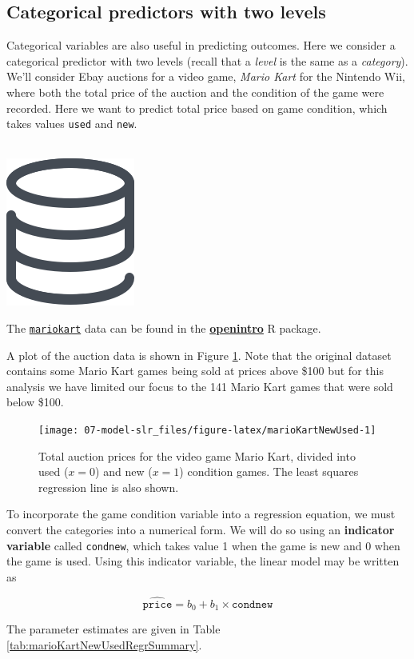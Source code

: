 \documentclass[
  10pt,
  openany]{book}
\newenvironment{mdframedwithfootTipDataPro}
{   
    \savenotes
    \begin{mdframed}[%
    topline=true, bottomline=true, linecolor=oiGray, linewidth=0.5pt,
    rightline=false, leftline=false,
    backgroundcolor=oiLGray]
    \renewcommand{\thempfootnote}{\arabic{footnote}}
    }
{
    \end{mdframed}
    \spewnotes
}
\newenvironment{data}{
\vspace{4mm}
\begin{mdframedwithfootTipDataPro}
\begin{minipage}[t]{0.10\textwidth}
{$\:$ \\ \setkeys{Gin}{width=2em,keepaspectratio}\includegraphics{images/_icons/data.png}}
\end{minipage}
\hfill
\begin{minipage}[t]{0.90\textwidth}
\vspace{-2mm}
\setlength{\parskip}{1em}
}{\end{minipage}
\end{mdframedwithfootTipDataPro}
\vspace{4mm}
}
\begin{document}
\hypertarget{categorical-predictor-two-levels}{%
\subsection{Categorical predictors with two levels}\label{categorical-predictor-two-levels}}

Categorical variables are also useful in predicting outcomes.
Here we consider a categorical predictor with two levels (recall that a \emph{level} is the same as a \emph{category}).
We'll consider Ebay auctions for a video game, \emph{Mario Kart} for the Nintendo Wii, where both the total price of the auction and the condition of the game were recorded.
Here we want to predict total price based on game condition, which takes values \texttt{used} and \texttt{new}.

\begin{data}
The \href{http://openintrostat.github.io/openintro/reference/mariokart.html}{\texttt{mariokart}} data can be found in the \href{http://openintrostat.github.io/openintro}{\textbf{openintro}} R package.

\end{data}

A plot of the auction data is shown in Figure \ref{fig:marioKartNewUsed}.
Note that the original dataset contains some Mario Kart games being sold at prices above \$100 but for this analysis we have limited our focus to the 141 Mario Kart games that were sold below \$100.

\begin{figure}[h]

{\centering \texttt{[image: 07-model-slr\_files/figure-latex/marioKartNewUsed-1]} 

}

\caption{Total auction prices for the video game Mario Kart, divided into used ($x = 0$) and new ($x = 1$) condition games. The least squares regression line is also shown.}\label{fig:marioKartNewUsed}
\end{figure}

To incorporate the game condition variable into a regression equation, we must convert the categories into a numerical form.
We will do so using an \textbf{indicator variable} called \texttt{condnew}, which takes value 1 when the game is new and 0 when the game is used.
Using this indicator variable, the linear model may be written as

\[\widehat{\texttt{price}} = b_0 + b_1 \times \texttt{condnew}\]

The parameter estimates are given in Table \ref{tab:marioKartNewUsedRegrSummary}.
\end{document}
